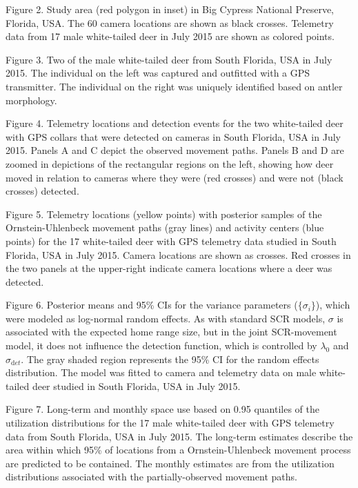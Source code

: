 \documentclass[12pt]{article}
\begin{document}
Figure 2. Study area (red polygon in inset) in Big Cypress National Preserve, 
    Florida, USA. The 60 camera locations are shown as black
    crosses. Telemetry data from 17 male white-tailed deer in July
    2015 are shown as colored points.    

Figure 3. Two of the male white-tailed deer from South Florida, USA
    in July 2015. The individual on the left was captured and
    outfitted with a GPS transmitter. The individual on the right was
    uniquely identified based on antler morphology.
    
Figure 4. Telemetry locations and detection events for the two
    white-tailed deer with GPS collars that were detected on cameras
    in South Florida, USA in July 2015. Panels A and C depict
    the observed movement paths. Panels B and D are zoomed in
    depictions of the rectangular regions on the left, showing how
    deer moved in relation to cameras where they were (red crosses)
    and were not (black crosses) detected. 

Figure 5. Telemetry locations (yellow points) with posterior samples
    of the Ornstein-Uhlenbeck movement paths (gray lines) and activity
    centers (blue points) for the 17 white-tailed deer with GPS
    telemetry data studied in South Florida, USA in July 2015. Camera
    locations are shown as crosses. Red crosses in the two panels at the
    upper-right indicate camera locations where a deer was detected.     

\clearpage

Figure 6. Posterior means and 95\% CIs for the variance parameters
    ($\{\sigma_i\}$), which were modeled as log-normal random
    effects. As with standard SCR models, $\sigma$ is associated with
    the expected home range size, but in the joint SCR-movement model, it
    does not influence the detection function, which is controlled by
    $\lambda_0$ and $\sigma_{\mathrm  det}$. 
    The gray shaded region represents the 95\% CI for the random effects 
    distribution. The model was fitted to camera and telemetry data on
    male white-tailed deer studied in South Florida, USA in July 2015.

Figure 7. Long-term and monthly space use based
    on 0.95 quantiles of the utilization distributions for the 17
    male white-tailed deer with GPS telemetry data from South Florida,
    USA in July 2015. The long-term estimates describe the
    area within which 95\% of locations from a Ornstein-Uhlenbeck
    movement process are {predicted} to be contained. The
    monthly estimates are from the utilization distributions
    associated with the partially-observed movement paths. 
\end{document}
